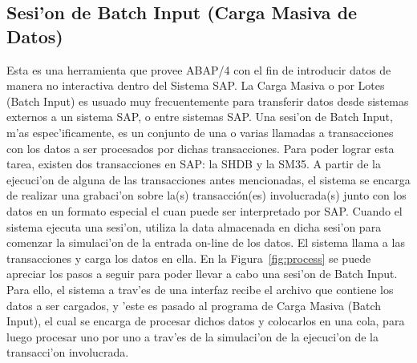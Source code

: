 \subsection{Sesi'on de Batch Input (Carga Masiva de Datos)}
	Esta es una herramienta que provee ABAP/4 con el fin de introducir datos de manera no interactiva dentro del Sistema SAP. La Carga Masiva o por Lotes (Batch Input) es usuado muy frecuentemente para transferir datos desde sistemas externos a un sistema SAP, o entre sistemas SAP. Una sesi'on de Batch Input, m'as espec'ificamente, es un conjunto de una o varias llamadas a transacciones con los datos a ser procesados por dichas transacciones.  
\newline
\newline
	Para poder lograr esta tarea, existen dos transacciones en SAP: la SHDB y la SM35. A partir de la ejecuci'on de alguna de las transacciones antes mencionadas, el sistema se encarga de realizar una grabaci'on sobre la(s) transacción(es) involucrada(s) junto con los datos en un formato especial el cuan puede ser interpretado por SAP. Cuando el sistema ejecuta una sesi'on, utiliza la data almacenada en dicha sesi'on para comenzar la simulaci'on de la entrada on-line de los datos. El sistema llama a las transacciones y carga los datos en ella. En la Figura~\ref{fig:process}  se puede apreciar los pasos a seguir para poder llevar a cabo una sesi'on de Batch Input. Para ello, el sistema a trav'es de una interfaz recibe el archivo que contiene los datos a ser cargados, y 'este es pasado al programa de Carga Masiva (Batch Input), el cual se encarga de procesar dichos datos y colocarlos en una cola, para luego procesar uno por uno a trav'es de la simulaci'on de la ejecuci'on de la transacci'on involucrada. 

